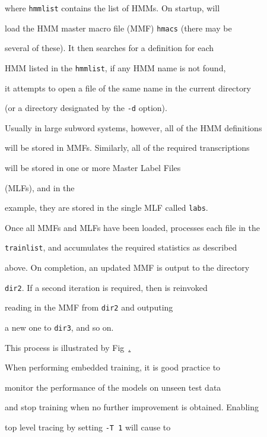 where \texttt{hmmlist} contains the list of HMMs.  On startup,  will 


load the HMM master macro file (MMF) \texttt{hmacs} (there may be


several of these).  It then searches for a definition for each


HMM listed in the \texttt{hmmlist}, if any HMM name is not found, 


it attempts to open a file of the same name in the current directory


(or a directory designated by the \texttt{-d} option).


Usually in large subword systems, however, all of the HMM definitions


will be stored in MMFs.  Similarly, all of the required transcriptions


will be stored in one or more Master Label Files


 (MLFs), and in the


example, they are stored in the single MLF called \texttt{labs}.










Once all MMFs and MLFs have been loaded,  processes each file in the


\texttt{trainlist}, and accumulates the required statistics as described


above.  On completion, an updated  MMF is output to the directory


\texttt{dir2}.  If a second iteration is required, then  is reinvoked


reading in the MMF from \texttt{dir2} and outputing 


a new one to \texttt{dir3}, and so on.


This process is illustrated by Fig~\href{f:herestdp}.





When performing embedded training,  it is good practice to


monitor the performance of the models on unseen test data


and stop training when no further improvement is obtained.  Enabling


top level tracing by setting \texttt{-T 1} will cause  to


